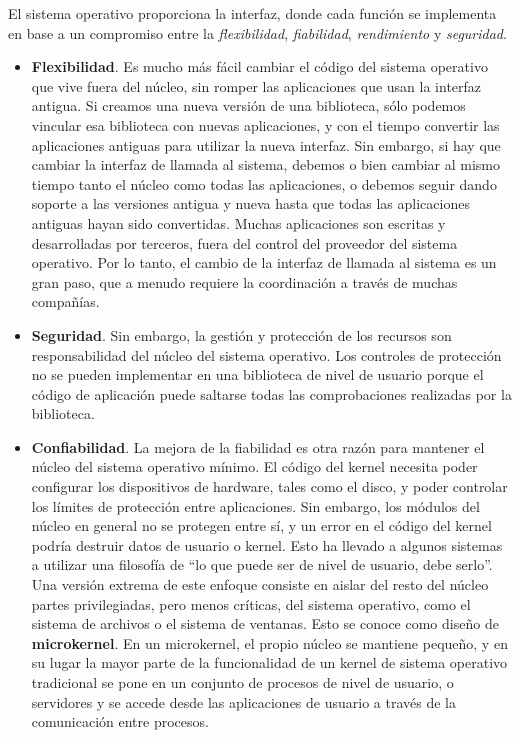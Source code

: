 \documentclass[10pt]{book}
\begin{document}
El sistema operativo proporciona la interfaz, donde cada función se implementa en base a un compromiso entre la \textit{flexibilidad}, \textit{fiabilidad}, \textit{rendimiento} y \textit{seguridad}.

\begin{itemize}
\item \textbf{Flexibilidad}. Es mucho más fácil cambiar el código del sistema operativo que vive fuera del núcleo, sin romper las aplicaciones que usan la interfaz antigua. Si creamos una nueva versión de una biblioteca, sólo podemos vincular esa biblioteca con nuevas aplicaciones, y con el tiempo convertir las aplicaciones antiguas para utilizar la nueva interfaz. Sin embargo, si hay que cambiar la interfaz de llamada al sistema, debemos o bien cambiar al mismo tiempo tanto el núcleo como todas las aplicaciones, o debemos seguir dando soporte a las versiones antigua y nueva hasta que todas las aplicaciones antiguas hayan sido convertidas. Muchas aplicaciones son escritas y desarrolladas por terceros, fuera del control del proveedor del sistema operativo. Por lo tanto, el cambio de la interfaz de llamada al sistema es un gran paso, que a menudo requiere la coordinación a través de muchas compañías.

\item \textbf{Seguridad}. Sin embargo, la gestión y protección de los recursos son responsabilidad del núcleo del sistema operativo. Los controles de protección no se pueden implementar en una biblioteca de nivel de usuario porque el código de aplicación puede saltarse todas las comprobaciones realizadas por la biblioteca.

\item \textbf{Confiabilidad}. La mejora de la fiabilidad es otra razón para mantener el núcleo del sistema operativo mínimo. El código del kernel necesita poder configurar los dispositivos de hardware, tales como el disco, y poder controlar los límites de protección entre aplicaciones. Sin embargo, los módulos del núcleo en general no se protegen entre sí, y un error en el código del kernel podría destruir datos de usuario o kernel. Esto ha llevado a algunos sistemas a utilizar una filosofía de ``lo que puede ser de nivel de usuario, debe serlo''. Una versión extrema de este enfoque consiste en aislar del resto del núcleo partes privilegiadas, pero menos críticas, del sistema operativo, como el sistema de archivos o el sistema de ventanas. Esto se conoce como diseño de \textbf{microkernel}. En un microkernel, el propio núcleo se mantiene pequeño, y en su lugar la mayor parte de la funcionalidad de un kernel de sistema operativo tradicional se pone en un conjunto de procesos de nivel de usuario, o servidores y se accede desde las aplicaciones de usuario a través de la comunicación entre procesos.


\end{itemize}
\end{document}
